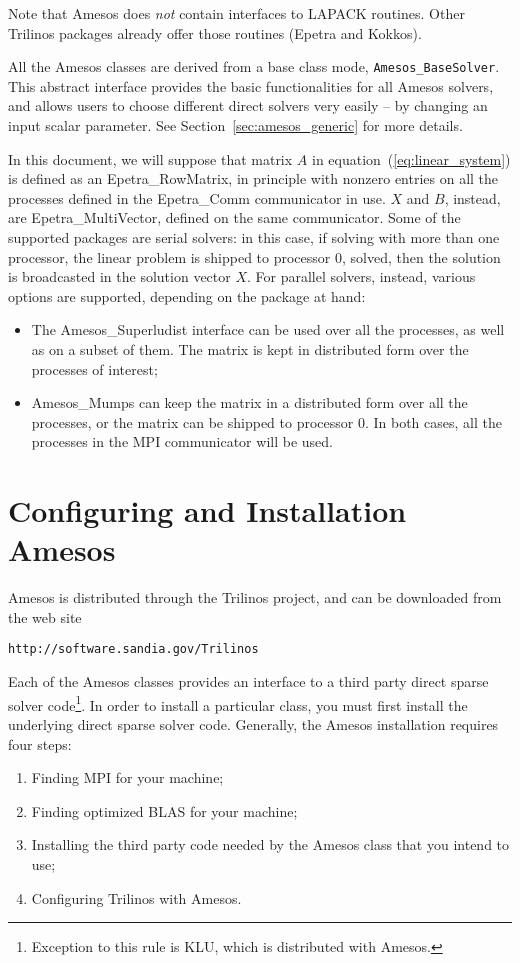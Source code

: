 \documentclass[11pt]{SANDreport}
\begin{document}
Note that Amesos does {\sl not} contain interfaces to LAPACK routines.
Other Trilinos packages already offer those routines (Epetra and
Kokkos).

All the Amesos classes are derived from a base class mode,
\verb!Amesos_BaseSolver!. This abstract interface provides the basic
functionalities for all Amesos solvers, and allows users to choose
different direct solvers very easily -- by changing an input scalar
parameter. See Section~\ref{sec:amesos_generic} for more details.

In this document, we will suppose that matrix $A$ in
equation~(\ref{eq:linear_system}) is defined as an Epetra\_RowMatrix, in
principle with nonzero entries on all the processes defined in the
Epetra\_Comm communicator in use. $X$ and $B$, instead, are
Epetra\_MultiVector, defined on the same communicator.  Some of the
supported packages are serial solvers: in this case, if solving with
more than one processor, the linear problem is shipped to processor 0,
solved, then the solution is broadcasted in the solution vector $X$. For
parallel solvers, instead, various options are supported, depending on
the package at hand:
\begin{itemize}
\item The Amesos\_Superludist interface can be used over all the
  processes, as well as on a subset of them. The matrix is kept in
  distributed form over the processes of interest;
\item Amesos\_Mumps can keep the matrix in a distributed form over all
  the processes, or the matrix can be shipped to processor 0. In both
  cases, all the processes in the MPI communicator will be used.
\end{itemize}



\section{Configuring and Installation Amesos}
\label{sec:3pl}

Amesos is distributed through the Trilinos project, and can be
downloaded from the web site
\begin{verbatim}
http://software.sandia.gov/Trilinos
\end{verbatim}

\smallskip

Each of the Amesos classes provides an interface to a third party direct
sparse solver code\footnote{Exception to this rule is KLU, which is
  distributed with Amesos.}. In order to install a particular class, you
must first install the underlying direct sparse solver code. Generally,
the Amesos installation requires four steps:
\begin{enumerate}
\item Finding MPI for your machine;
\item Finding optimized BLAS for your machine;
\item Installing the third party code needed by the Amesos class that
  you intend to use;
\item Configuring Trilinos with Amesos. 
\end{enumerate}
\end{document}
